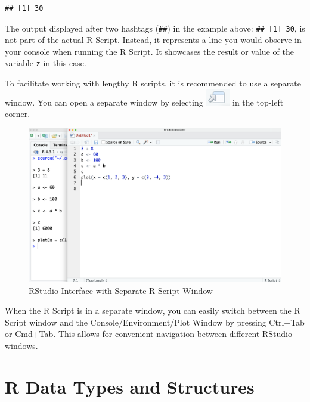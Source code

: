 \documentclass[
]{book}
\begin{document}
\begin{verbatim}
## [1] 30
\end{verbatim}

The output displayed after two hashtags (\texttt{\#\#}) in the example above: \texttt{\#\#\ {[}1{]}\ 30}, is not part of the actual R Script. Instead, it represents a line you would observe in your console when running the R Script. It showcases the result or value of the variable \texttt{z} in this case.

To facilitate working with lengthy R scripts, it is recommended to use a separate window. You can open a separate window by selecting \includegraphics{files/icons-rstudio/show-in-new-window.png} in the top-left corner.

\begin{figure}
\centering
\includegraphics{files/icons-rstudio/rstudio-rscript-separate.png}
\caption{\label{fig:rstudio-rscript-separate}RStudio Interface with Separate R Script Window}
\end{figure}

When the R Script is in a separate window, you can easily switch between the R Script window and the Console/Environment/Plot Window by pressing Ctrl+Tab or Cmd+Tab. This allows for convenient navigation between different RStudio windows.

\hypertarget{r-data-types-and-structures}{%
\section{R Data Types and Structures}\label{r-data-types-and-structures}}
\end{document}
